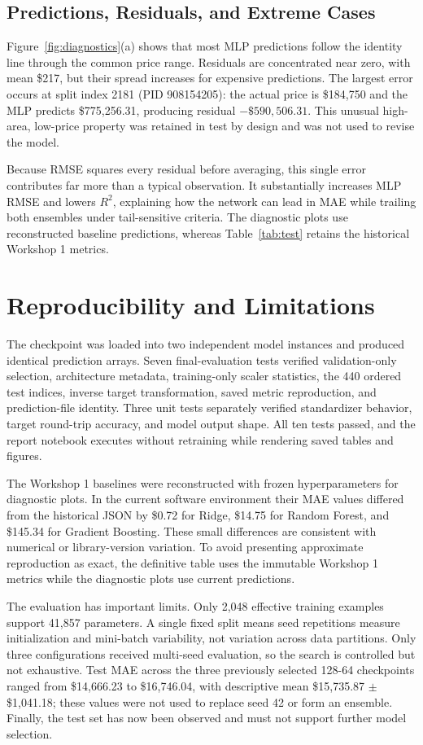 \documentclass[11pt,a4paper]{article}
\begin{document}
\subsection{Predictions, Residuals, and Extreme Cases}
Figure~\ref{fig:diagnostics}(a) shows that most MLP predictions follow the identity line through the common price range. Residuals are concentrated near zero, with mean \$217, but their spread increases for expensive predictions. The largest error occurs at split index 2181 (PID 908154205): the actual price is \$184,750 and the MLP predicts \$775,256.31, producing residual $-\$590,506.31$. This unusual high-area, low-price property was retained in test by design and was not used to revise the model.

Because RMSE squares every residual before averaging, this single error contributes far more than a typical observation. It substantially increases MLP RMSE and lowers $R^2$, explaining how the network can lead in MAE while trailing both ensembles under tail-sensitive criteria. The diagnostic plots use reconstructed baseline predictions, whereas Table~\ref{tab:test} retains the historical Workshop 1 metrics.

\section{Reproducibility and Limitations}
The checkpoint was loaded into two independent model instances and produced identical prediction arrays. Seven final-evaluation tests verified validation-only selection, architecture metadata, training-only scaler statistics, the 440 ordered test indices, inverse target transformation, saved metric reproduction, and prediction-file identity. Three unit tests separately verified standardizer behavior, target round-trip accuracy, and model output shape. All ten tests passed, and the report notebook executes without retraining while rendering saved tables and figures.

The Workshop 1 baselines were reconstructed with frozen hyperparameters for diagnostic plots. In the current software environment their MAE values differed from the historical JSON by \$0.72 for Ridge, \$14.75 for Random Forest, and \$145.34 for Gradient Boosting. These small differences are consistent with numerical or library-version variation. To avoid presenting approximate reproduction as exact, the definitive table uses the immutable Workshop 1 metrics while the diagnostic plots use current predictions.

The evaluation has important limits. Only 2,048 effective training examples support 41,857 parameters. A single fixed split means seed repetitions measure initialization and mini-batch variability, not variation across data partitions. Only three configurations received multi-seed evaluation, so the search is controlled but not exhaustive. Test MAE across the three previously selected 128-64 checkpoints ranged from \$14,666.23 to \$16,746.04, with descriptive mean \$15,735.87 $\pm$ \$1,041.18; these values were not used to replace seed 42 or form an ensemble. Finally, the test set has now been observed and must not support further model selection.
\end{document}
